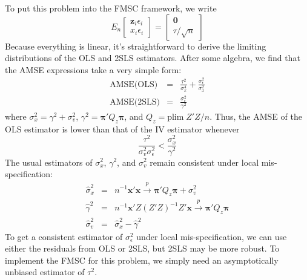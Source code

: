 To put this problem into the FMSC framework, we write
	 $$E_n \left[\begin{array}{c} \mathbf{z}_i \epsilon_i \\ x_i \epsilon_i \end{array}\right] = \left[\begin{array}{c} \mathbf{0} \\ \tau/\sqrt{n} \end{array}\right]$$
Because everything is linear, it's straightforward to derive the limiting distributions of the OLS and 2SLS estimators. After some algebra, we find that the AMSE expressions take a very simple form:
  \begin{eqnarray*}
  \mbox{AMSE(OLS)} &=& \frac{\tau^2}{\sigma_x^4} + \frac{\sigma_\epsilon^2}{\sigma_x^2}\\
  \mbox{AMSE(2SLS)} &=& \frac{\sigma_\epsilon^2}{\gamma^2}
  \end{eqnarray*}
where $\sigma_x^2 = \gamma^2 + \sigma_v^2$, $\gamma^2 = \boldsymbol{\pi}'Q_z \boldsymbol{\pi}$, and $Q_z =\mbox{plim} \; Z'Z/n$. Thus, the AMSE of the OLS estimator is lower than that of the IV estimator whenever
$$\frac{\tau^2}{\sigma_v^2 \sigma_\epsilon^2}  < \frac{\sigma_x^2}{\gamma^2} $$
The usual estimators of $\sigma_x^2$, $\gamma^2$, and $\sigma_v^2$ remain consistent under local mis-specification:
  \begin{eqnarray*}
     \widehat{\sigma}_x^2 &=& n^{-1}\mathbf{x}' \mathbf{x} \overset{p}{\rightarrow} \boldsymbol{\pi}'Q_z \boldsymbol{\pi} + \sigma_v^2\\
      \widehat{\gamma}^2 &=& n^{-1}\mathbf{x}' Z (Z'Z)^{-1}Z' \mathbf{x} \overset{p}{\rightarrow} \boldsymbol{\pi}'Q_z \boldsymbol{\pi} \\
      \widehat{\sigma}_v^2 &=& \widehat{\sigma}_x^2 - \widehat{\gamma}^2
  \end{eqnarray*}
To get a consistent estimator of $\sigma_\epsilon^2$ under local mis-specification, we can use either the residuals from OLS or 2SLS, but 2SLS may be more robust. To implement the FMSC for this problem, we simply need an asymptotically unbiased estimator of $\tau^2$. 

